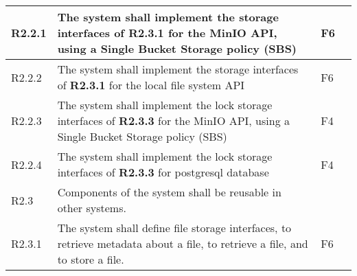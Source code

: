 \begin{landscape}
\begin{longtable}{|p{1cm}|p{19cm}|p{2cm}|p{3cm}|}
        R2.2.1                              & The system shall implement the storage interfaces of \textbf{R2.3.1} for the MinIO API, using a Single Bucket Storage policy (SBS)                                                                                                                                                    & F6                    &                                          \\\hline
        R2.2.2                              & The system shall implement the storage interfaces of \textbf{R2.3.1} for the local file system API                                                                                                                                                                                    & F6                    &                                          \\\hline
        R2.2.3                              & The system shall implement the lock storage interfaces of \textbf{R2.3.3} for the MinIO API, using a Single Bucket Storage policy (SBS)                                                                                                                                               & F4                    &                                          \\\hline
        R2.2.4                              & The system shall implement the lock storage interfaces of \textbf{R2.3.3} for postgresql database                                                                                                                                                                                     & F4                    &                                          \\\hline
        \rowcolor[HTML]{DDDDDD}        R2.3 & Components of the system shall be reusable in other systems.                                                                                                                                                                                                                          &                       &                                          \\ \hline
        R2.3.1                              & The system shall define file storage interfaces, to retrieve metadata about a file, to retrieve a file, and to store a file.                                                                                                                                                          & F6                    &                                          \\\hline

\end{longtable}
\end{landscape}
